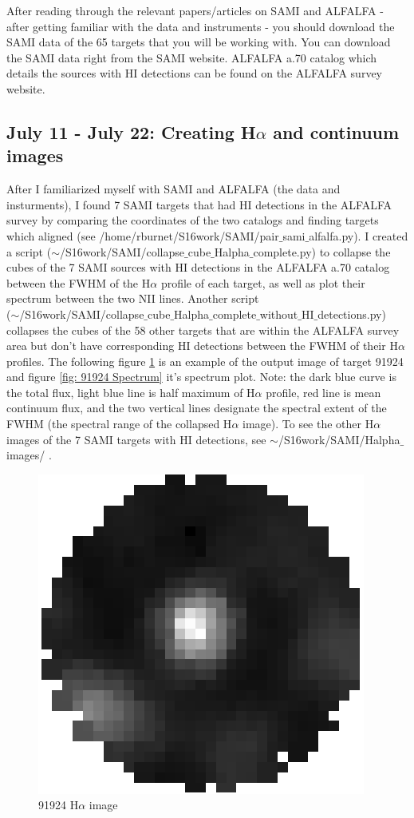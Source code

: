 \documentclass[10pt,letterpaper]{article}
\begin{document}
After reading through the relevant papers/articles on SAMI and ALFALFA - after getting familiar with the data and instruments - you should download the SAMI data of the 65 targets that you will be working with. You can download the SAMI data right from the SAMI website. ALFALFA a.70 catalog which details the sources with HI detections can be found on the ALFALFA survey website.

\subsection{July 11 - July 22: Creating H$\alpha$ and continuum images}
After I familiarized myself with SAMI and ALFALFA (the data and insturments), I found 7 SAMI targets that had HI detections in the ALFALFA survey by comparing the coordinates of the two catalogs and finding targets which aligned (see /home/rburnet/S16work/SAMI/pair$\_$sami$\_$alfalfa.py). I created a script ($\sim$/S16work/SAMI/collapse$\_$cube$\_$Halpha$\_$complete.py) to collapse the cubes of the 7 SAMI sources with HI detections in the ALFALFA a.70 catalog between the FWHM of the H$\alpha$ profile of each target, as well as plot their spectrum between the two NII lines. Another script \\($\sim$/S16work/SAMI/collapse$\_$cube$\_$Halpha$\_$complete$\_$without$\_$HI$\_$detections.py) collapses the cubes of the 58 other targets that are within the ALFALFA survey area but don't have corresponding HI detections between the FWHM of their H$\alpha$ profiles. The following figure \ref{fig: 91924 Halpha image} is an example of the output image of target 91924 and figure \ref{fig: 91924 Spectrum} it's spectrum plot. Note: the dark blue curve is the total flux, light blue line is half maximum of H$\alpha$ profile, red line is mean continuum flux, and the two vertical lines designate the spectral extent of the FWHM (the spectral range of the collapsed H$\alpha$ image). To see the other H$\alpha$ images of the 7 SAMI targets with HI detections, see $\sim$/S16work/SAMI/Halpha$\_$images/ .

\begin{figure}[h!]
\center
\caption{91924 H$\alpha$ image}\label{fig: 91924 Halpha image}
\includegraphics[scale=0.4]{figures/91924_Halpha_image.png}
\end{figure}
\end{document}
